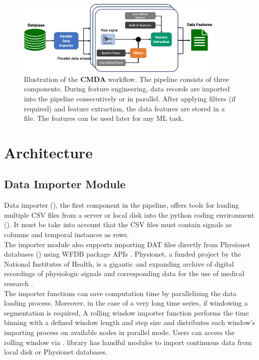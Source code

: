 \documentclass{article}
\begin{document}
\begin{figure}[h]
\includegraphics[width=0.9\textwidth]{workflow.png}
\centering
\caption{Illustration of the \textbf{CMDA} workflow. The pipeline consists of three components. During feature engineering, data records are imported into the pipeline consecutively or in parallel. After applying filters (if required) and feature extraction, the data features are stored in a file. The features can be used later for any ML task.}
\label{fig:workflow}
\end{figure}



\section{Architecture}
\subsection{Data Importer Module}
Data importer (), the first component in the pipeline, offers tools for loading multiple CSV files from a server or local disk into the python coding environment (). It must be take into account that the CSV files must contain signals as columns and temporal instances as rows.\\
The importer module also supports importing DAT files directly from Physionet databases () using WFDB package APIs \cite{xie_chen_waveform_nodate}.
Physionet, a funded project by the National Institutes of Health, is a gigantic and expanding archive of digital recordings of physiologic signals and corresponding data for the use of medical research \cite{goldberger_physiobank_2000}.\\
The importer functions can save computation time by parallelizing the data loading process. 
Moreover, in the case of a very long time series, if windowing a segmentation is required, A rolling window importer function performs the time binning with a defined window length and step size and distributes each window's importing process on available nodes in parallel mode. Users can access the rolling window via .
 library has handful modules to import continuous data from local disk or Physionet databases.
\end{document}
